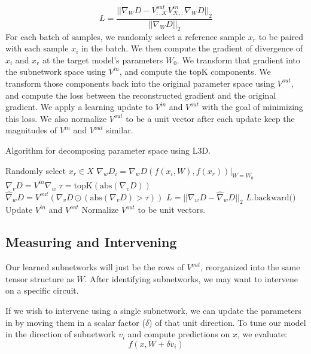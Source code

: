 \documentclass{article}
\theoremstyle{plain}
\theoremstyle{definition}
\theoremstyle{remark}
\begin{document}
\begin{equation}
    L = \frac{{|| \nabla_W D - V^{out}_{:,\mathcal{K}} V^{in}_{\mathcal{K},:} \nabla_W D ||}_2}{{|| \nabla_W D ||}_2}
\end{equation}
For each batch of samples, we randomly select a reference sample $x_r$ to be paired with each sample $x_i$ in the batch. We then compute the gradient of divergence of $x_i$ and $x_r$ at the target model's parameters $W_0$. We transform that gradient into the subnetwork space using $V^{in}$, and compute the $\text{topK}$ components. We transform those components back into the original parameter space using $V^{out}$, and compute the loss between the reconstructed gradient and the original gradient. We apply a learning update to $V^{in}$ and $V^{out}$ with the goal of minimizing this loss. We also normalize $V^{out}$ to be a unit vector after each update keep the magnitudes of $V^{in}$ and $V^{out}$ similar.


\begin{algorithm}\label{alg:training}
\caption{Algorithm for decomposing parameter space using L3D.}
\begin{algorithmic}[1]
            \STATE Randomly select $x_r \in X$
            \STATE $\nabla_w D_i = \nabla_w D(f(x_i, W), f(x_r))|_{W=W_0}$
        \ENDFOR
        \STATE $\nabla_v D = {V^{in}} \nabla_w$
        \STATE $\tau = \text{topK}(\text{abs}(\nabla_v D))$
        \STATE $\hat{\nabla}_w D = {V^{out}} (\nabla_v D \odot (\text{abs}(\nabla_v D) > \tau))$
        \STATE $L = {|| \nabla_w D - \hat{\nabla}_w D ||}_2$
        \STATE $L.\text{backward()}$
        \STATE Update $V^{in}$ and $V^{out}$
        \STATE Normalize $V^{out}$ to be unit vectors.
    \ENDFOR
\ENDFOR
\end{algorithmic}
\end{algorithm}

\subsection{Measuring and Intervening}\label{subsec:intervention}

Our learned subnetworks will just be the rows of $V^{out}$, reorganized into the same tensor structure as $W$. After identifying subnetworks, we may want to intervene on a specific circuit.

If we wish to intervene using a single subnetwork, we can update the parameters in by moving them in a scalar factor ($\delta$) of that unit direction. To tune our model in the direction of subnetwork $v_i$ and compute predictions on $x$, we evaluate:
\begin{equation}
    f(x, W + \delta v_i)
\end{equation}
\end{document}
